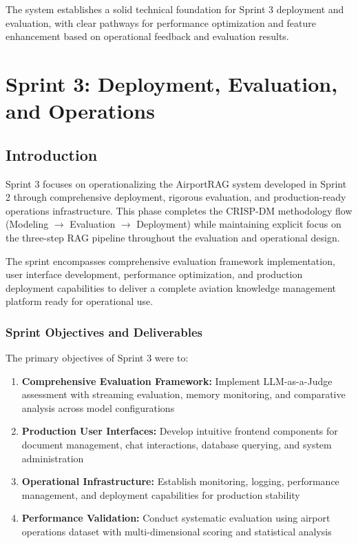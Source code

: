 The system establishes a solid technical foundation for Sprint 3 deployment and evaluation, with clear pathways for performance optimization and feature enhancement based on operational feedback and evaluation results.

\chapter{Sprint 3: Deployment, Evaluation, and Operations}
\label{chap:sprint3_deploy_eval}

\section{Introduction}
\label{sec:intro_s3}

Sprint 3 focuses on operationalizing the AirportRAG system developed in Sprint 2 through comprehensive deployment, rigorous evaluation, and production-ready operations infrastructure. This phase completes the CRISP-DM methodology flow (Modeling $\rightarrow$ Evaluation $\rightarrow$ Deployment) while maintaining explicit focus on the three-step RAG pipeline throughout the evaluation and operational design.

The sprint encompasses comprehensive evaluation framework implementation, user interface development, performance optimization, and production deployment capabilities to deliver a complete aviation knowledge management platform ready for operational use.

\subsection{Sprint Objectives and Deliverables}
The primary objectives of Sprint 3 were to:
\begin{enumerate}
    \item \textbf{Comprehensive Evaluation Framework:} Implement LLM-as-a-Judge assessment with streaming evaluation, memory monitoring, and comparative analysis across model configurations
    \item \textbf{Production User Interfaces:} Develop intuitive frontend components for document management, chat interactions, database querying, and system administration
    \item \textbf{Operational Infrastructure:} Establish monitoring, logging, performance management, and deployment capabilities for production stability
    \item \textbf{Performance Validation:} Conduct systematic evaluation using airport operations dataset with multi-dimensional scoring and statistical analysis
\end{enumerate}

